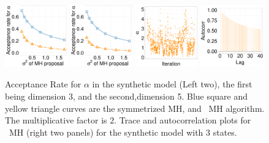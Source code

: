   \begin{figure}[H]
  \centering
  \begin{minipage}[!hp]{0.99\linewidth}
    \includegraphics [width=0.24\textwidth, angle=0]{figs/acc/EXP_D3alpha_k2.pdf}
    \includegraphics [width=0.24\textwidth, angle=0]{figs/acc/EXP_D5alpha_k2.pdf}
    \includegraphics [width=0.24\textwidth, angle=0]{figs/EXP_ks/exp_traceoMH_7_05_3_.pdf}
    \includegraphics [width=0.24\textwidth, angle=0]{figs/EXP_ks/exp_omhacf_7_05_3_.pdf}
  \end{minipage}
    \caption{Acceptance Rate for $\alpha$ in the synthetic model (Left two), the first being dimension 3, and the second,dimension 5. Blue square and yellow triangle curves are the symmetrized MH, and \naive\ MH  algorithm. The multiplicative factor is $2$. Trace and autocorrelation plots for \naive\ MH  (right two panels) for the synthetic model with $3$ states.}
     \label{fig:ACC_EXP}
  \end{figure}


